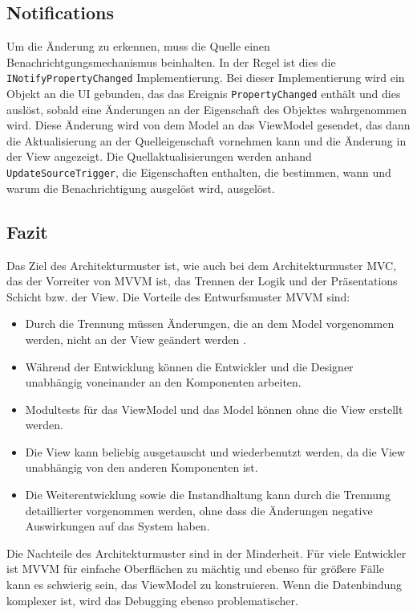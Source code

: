 \subsection*{Notifications}
Um die \"Anderung zu erkennen, muss die Quelle einen Benachrichtgungsmechanismus beinhalten. In der Regel ist dies die \texttt{INotifyPropertyChanged} Implementierung. Bei dieser Implementierung wird ein Objekt an die \ac{UI} gebunden, das das Ereignis \texttt{PropertyChanged} enth\"alt und dies ausl\"ost, sobald eine \"Anderungen an der Eigenschaft des Objektes wahrgenommen wird. Diese \"Anderung wird von dem Model an das ViewModel gesendet, das dann die Aktualisierung an der Quelleigenschaft vornehmen kann und die \"Anderung in der View angezeigt.
Die Quellaktualisierungen werden anhand \texttt{UpdateSourceTrigger}, die Eigenschaften enthalten, die bestimmen, wann und warum die Benachrichtigung ausgel\"ost wird,  ausgel\"ost. 


\subsection*{Fazit}
Das Ziel des Architekturmuster ist, wie auch bei dem Architekturmuster \ac{MVC}, das der Vorreiter von \ac{MVVM} ist, das Trennen der Logik und der Pr\"asentations Schicht bzw. der View.
Die Vorteile des Entwurfsmuster \ac{MVVM} sind:
\begin{itemize}
\item Durch die Trennung m\"ussen \"Anderungen, die an dem Model vorgenommen werden, nicht an der View ge\"andert werden\cite{tutorialspointMVVM} .
\item W\"ahrend der Entwicklung k\"onnen die Entwickler und die Designer unabh\"angig voneinander an den Komponenten arbeiten\cite{Pete2016}.
\item Modultests f\"ur das ViewModel und das Model k\"onnen ohne die View erstellt werden\cite{Pete2016}.
\item Die View kann beliebig ausgetauscht und wiederbenutzt werden, da die View unabh\"angig von den anderen Komponenten ist\cite{Pete2016}.
\item Die Weiterentwicklung sowie die Instandhaltung kann durch die Trennung detaillierter vorgenommen werden, ohne dass die  \"Anderungen negative Auswirkungen auf das System haben\cite{tutorialspointMVVM}.
\end{itemize}
Die Nachteile des Architekturmuster sind in der Minderheit.
F\"ur viele Entwickler ist \ac{MVVM} f\"ur einfache Oberfl\"achen zu m\"achtig und ebenso f\"ur gr\"o\ss{}ere F\"alle kann es schwierig sein, das ViewModel zu konstruieren.
Wenn die Datenbindung komplexer ist, wird das Debugging ebenso problematischer\cite{tutorialspointMVVM}.

